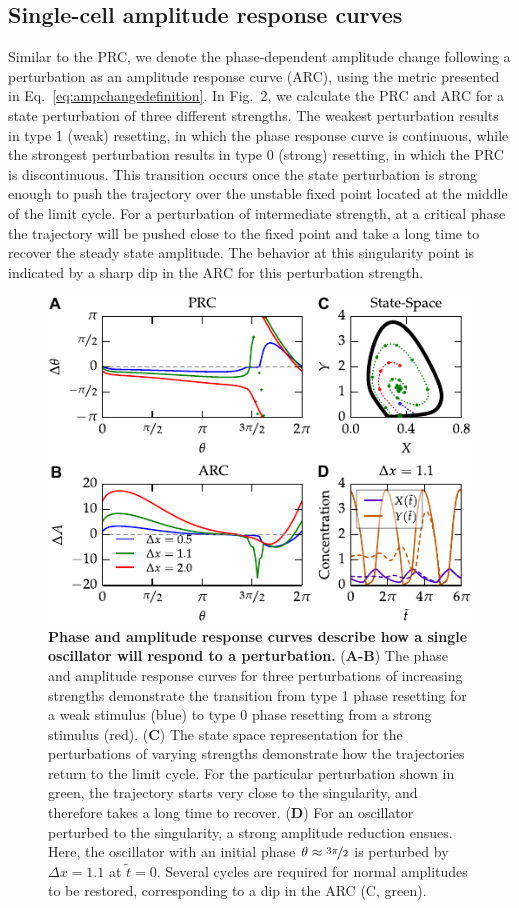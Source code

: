 \documentclass[11pt, letterpaper]{article}
\begin{document}
\subsection*{Single-cell amplitude response curves}
Similar to the PRC, we denote the phase-dependent amplitude change following a perturbation as an amplitude response curve (ARC), using the metric presented in Eq.~\ref{eq:ampchangedefinition}.
In Fig.~2, we calculate the PRC and ARC for a state perturbation of three different strengths.
The weakest perturbation results in type 1 (weak) resetting, in which the phase response curve is continuous, while the strongest perturbation results in type 0 (strong) resetting, in which the PRC is discontinuous.
This transition occurs once the state perturbation is strong enough to push the trajectory over the unstable fixed point located at the middle of the limit cycle.
For a perturbation of intermediate strength, at a critical phase the trajectory will be pushed close to the fixed point and take a long time to recover the steady state amplitude.
The behavior at this singularity point is indicated by a sharp dip in the ARC for this perturbation strength.

\begin{figure}[tbp]
  \begin{center}
    \includegraphics[width=.75\textwidth]{figures/figure_2.pdf}
    \caption{
{\bfseries Phase and amplitude response curves describe how a single oscillator will respond to a perturbation.}  ({\bfseries A-B}) The phase and amplitude response curves for three perturbations of increasing strengths demonstrate the transition from type 1 phase resetting for a weak stimulus (blue) to type 0 phase resetting from a strong stimulus (red).
({\bfseries C}) The state space representation for the perturbations of varying strengths demonstrate how the trajectories return to the limit cycle.
For the particular perturbation shown in green, the trajectory starts very close to the singularity, and therefore takes a long time to recover.
({\bfseries D}) For an oscillator perturbed to the singularity, a strong amplitude reduction ensues.
Here, the oscillator with an initial phase $\theta \approx \nicefrac{3\pi}{2}$ is perturbed by $\Delta x = 1.1$ at $\tilde{t} = 0$.
Several cycles are required for normal amplitudes to be restored, corresponding to a dip in the ARC (C, green).}
  \end{center}
\end{figure}
\end{document}

